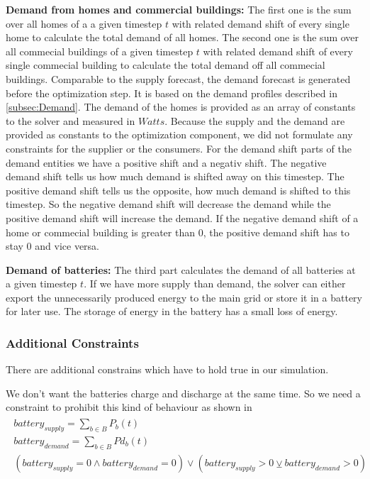 \textbf{Demand from homes and commercial buildings:} The first one is the sum over all homes of a a given timestep $t$ with related demand shift of every single home to calculate the total demand of all homes.
The second one is the sum over all commecial buildings of a given timestep $t$ with related demand shift of every single commecial building to calculate the total demand off all commecial buildings.
Comparable to the supply forecast, the demand forecast is generated before the optimization step. 
It is based on the demand profiles described in \cref{subsec:Demand}. 
The demand of the homes is provided as an array of constants to the solver and measured in $Watts$. 
Because the supply and the demand are provided as constants to the optimization component, we did not formulate any constraints for the supplier or the consumers.
For the demand shift parts of the demand entities we have a positive shift and a negativ shift.
The negative demand shift tells us how much demand is shifted away on this timestep.
The positive demand shift tells us the opposite, how much demand is shifted to this timestep.
So the negative demand shift will decrease the demand while the positive demand shift will increase the demand.
If the negative demand shift of a home or commecial building is greater than 0, the positive demand shift has to stay 0 and vice versa.

\textbf{Demand of batteries:}
The third part calculates the demand of all batteries at a given timestep $t$.
If we have more supply than demand, the solver can either export the unnecessarily produced energy to the main grid or store it in a battery for later use.
The storage of energy in the battery has a small loss of energy.

\subsubsection{Additional Constraints}
There are additional constrains which have to hold true in our simulation.

We don't want the batteries charge and discharge at the same time.
So we need a constraint to prohibit this kind of behaviour as shown in 
\begin{align} \label{eq:batteryConstraint}
\begin{split}
battery_{supply} = \sum\limits_{b\in B} P_{b}(t)\\
battery_{demand} = \sum\limits_{b\in B} Pd_{b}(t)\\
(battery_{supply} = 0 \wedge battery_{demand} = 0 ) \vee (battery_{supply} > 0 \veebar battery_{demand} > 0)
\end{split}
\end{align}

